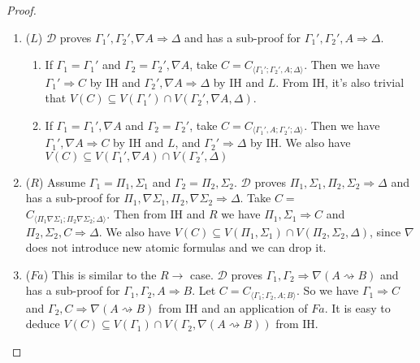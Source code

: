 \documentclass[12pt,a4paper]{article}
\theoremstyle{plain}
\theoremstyle{definition}
\begin{document}
\begin{proof}
\begin{enumerate}
	\item ($L$) $\mathcal{D}$ proves $\Gamma_1' , \Gamma_2' , \nabla A \Rightarrow \Delta$ and has a sub-proof for $\Gamma_1' , \Gamma_2' , A \Rightarrow \Delta$.
	\begin{enumerate}
		\item If $\Gamma_1 = \Gamma_1'$ and $\Gamma_2 = \Gamma_2' , \nabla A$, take $C = C_{\langle\Gamma_1';\Gamma_2',A;\Delta\rangle}$. Then we have $\Gamma_1' \Rightarrow C$ by IH and $\Gamma_2' , \nabla A \Rightarrow \Delta$ by IH and $L$. From IH, it's also trivial that $V(C) \subseteq V(\Gamma_1') \cap V(\Gamma_2',\nabla A,\Delta)$.
		
		\item If $\Gamma_1 = \Gamma_1' , \nabla A$ and $\Gamma_2 = \Gamma_2'$, take $C = C_{\langle\Gamma_1',A;\Gamma_2';\Delta\rangle}$. Then we have $\Gamma_1' , \nabla A \Rightarrow C$ by IH and $L$, and $\Gamma_2' \Rightarrow \Delta$ by IH. We also have $V(C) \subseteq V(\Gamma_1', \nabla A) \cap V(\Gamma_2',\Delta)$
	\end{enumerate}

	\item ($R$) Assume $\Gamma_1 = \Pi_1, \Sigma_1$ and $\Gamma_2 = \Pi_2, \Sigma_2$. $\mathcal{D}$ proves $\Pi_1, \Sigma_1, \Pi_2, \Sigma_2 \Rightarrow \Delta$ and has a sub-proof for $\Pi_1, \nabla\Sigma_1, \Pi_2, \nabla\Sigma_2 \Rightarrow \Delta$.
	Take $C =$\\ $C_{\langle\Pi_1\nabla\Sigma_1;\Pi_2\nabla\Sigma_2;\Delta\rangle}$. Then from IH and $R$ we have $\Pi_1, \Sigma_1 \Rightarrow C$ and $\Pi_2, \Sigma_2, C \Rightarrow \Delta$. We also have $V(C) \subseteq V(\Pi_1,\Sigma_1) \cap V(\Pi_2,\Sigma_2,\Delta)$, since $\nabla$ does not introduce new atomic formulas and we can drop it.

	\item ($Fa$) This is similar to the $R\rightarrow$ case. $\mathcal{D}$ proves $\Gamma_1 , \Gamma_2 \Rightarrow \nabla(A \rightsquigarrow B)$ and has a sub-proof for $\Gamma_1 , \Gamma_2 , A \Rightarrow B$. Let $C = C_{\langle\Gamma_1;\Gamma_2,A;B\rangle}$. So we have $\Gamma_1 \Rightarrow C$ and $\Gamma_2 , C \Rightarrow \nabla (A \rightsquigarrow B)$ from IH and an application of $Fa$.
	It is easy to deduce $V(C) \subseteq V(\Gamma_1) \cap V(\Gamma_2 , \nabla (A \rightsquigarrow B))$ from IH.


\end{enumerate}
\end{proof}
\end{document}
